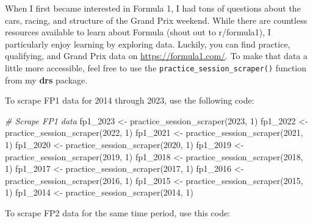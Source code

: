 \documentclass[
]{book}
\newenvironment{Shaded}{\begin{snugshade}}{\end{snugshade}}
\newcommand{\CommentTok}[1]{\textcolor[rgb]{0.56,0.35,0.01}{\textit{#1}}}
\newcommand{\DecValTok}[1]{\textcolor[rgb]{0.00,0.00,0.81}{#1}}
\newcommand{\FunctionTok}[1]{\textcolor[rgb]{0.00,0.00,0.00}{#1}}
\newcommand{\NormalTok}[1]{#1}
\newcommand{\OtherTok}[1]{\textcolor[rgb]{0.56,0.35,0.01}{#1}}
\begin{document}
When I first became interested in Formula 1, I had tons of questions about the cars, racing, and structure of the Grand Prix weekend. While there are countless resources available to learn about Formula (shout out to r/formula1), I particularly enjoy learning by exploring data. Luckily, you can find practice, qualifying, and Grand Prix data on \url{https://formula1.com/}. To make that data a little more accessible, feel free to use the \texttt{practice\_session\_scraper()} function from my \textbf{drs} package.

To scrape FP1 data for 2014 through 2023, use the following code:

\begin{Shaded}
\begin{Highlighting}[]
\CommentTok{\# Scrape FP1 data}
\NormalTok{fp1\_2023 }\OtherTok{\textless{}{-}} \FunctionTok{practice\_session\_scraper}\NormalTok{(}\DecValTok{2023}\NormalTok{, }\DecValTok{1}\NormalTok{)}
\NormalTok{fp1\_2022 }\OtherTok{\textless{}{-}} \FunctionTok{practice\_session\_scraper}\NormalTok{(}\DecValTok{2022}\NormalTok{, }\DecValTok{1}\NormalTok{)}
\NormalTok{fp1\_2021 }\OtherTok{\textless{}{-}} \FunctionTok{practice\_session\_scraper}\NormalTok{(}\DecValTok{2021}\NormalTok{, }\DecValTok{1}\NormalTok{)}
\NormalTok{fp1\_2020 }\OtherTok{\textless{}{-}} \FunctionTok{practice\_session\_scraper}\NormalTok{(}\DecValTok{2020}\NormalTok{, }\DecValTok{1}\NormalTok{)}
\NormalTok{fp1\_2019 }\OtherTok{\textless{}{-}} \FunctionTok{practice\_session\_scraper}\NormalTok{(}\DecValTok{2019}\NormalTok{, }\DecValTok{1}\NormalTok{)}
\NormalTok{fp1\_2018 }\OtherTok{\textless{}{-}} \FunctionTok{practice\_session\_scraper}\NormalTok{(}\DecValTok{2018}\NormalTok{, }\DecValTok{1}\NormalTok{)}
\NormalTok{fp1\_2017 }\OtherTok{\textless{}{-}} \FunctionTok{practice\_session\_scraper}\NormalTok{(}\DecValTok{2017}\NormalTok{, }\DecValTok{1}\NormalTok{)}
\NormalTok{fp1\_2016 }\OtherTok{\textless{}{-}} \FunctionTok{practice\_session\_scraper}\NormalTok{(}\DecValTok{2016}\NormalTok{, }\DecValTok{1}\NormalTok{)}
\NormalTok{fp1\_2015 }\OtherTok{\textless{}{-}} \FunctionTok{practice\_session\_scraper}\NormalTok{(}\DecValTok{2015}\NormalTok{, }\DecValTok{1}\NormalTok{)}
\NormalTok{fp1\_2014 }\OtherTok{\textless{}{-}} \FunctionTok{practice\_session\_scraper}\NormalTok{(}\DecValTok{2014}\NormalTok{, }\DecValTok{1}\NormalTok{)}
\end{Highlighting}
\end{Shaded}

To scrape FP2 data for the same time period, use this code:
\end{document}
